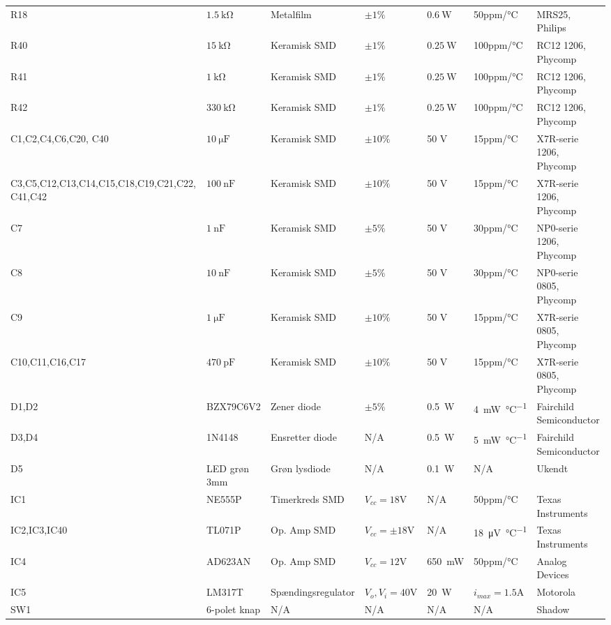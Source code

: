 \begin{table}[h!]
\begin{threeparttable}
\begin{tabular}{ l l l l l l l }
R18 & $\SI{1.5}{\kilo\ohm}$		& Metalfilm	& $\pm 1\%$ 		 & $\SI{0.6}{\watt}$	  & 50ppm/\si{\celsius}  & MRS25, Philips \\
R40 & $\SI{15}{\kilo\ohm}$ 	& Keramisk SMD 	& $\pm 1\%$			& $\SI{0.25}{\watt}$ 	& 100ppm/\si{\celsius}	& RC12 1206, Phycomp \\
R41 & $\SI{1}{\kilo\ohm}$ 	& Keramisk SMD 	& $\pm 1\%$			& $\SI{0.25}{\watt}$ 	& 100ppm/\si{\celsius}	& RC12 1206, Phycomp \\
R42 & $\SI{330}{\kilo\ohm}$ 	& Keramisk SMD 	& $\pm 1\%$			& $\SI{0.25}{\watt}$ 	& 100ppm/\si{\celsius}	& RC12 1206, Phycomp \\
C1,C2,C4,C6,C20, C40 & $\SI{10}{\micro\farad}$ & Keramisk SMD & $\pm 10\%$ & 50 \si{\volt}  & 15ppm/\si{\celsius} & X7R-serie 1206, Phycomp \\
C3,C5,C12,C13,C14,C15,C18,C19,C21,C22, C41,C42 & $\SI{100}{\nano\farad}$ & Keramisk SMD & $\pm 10\%$ & 50 \si{\volt} & 15ppm/\si{\celsius} & X7R-serie 1206, Phycomp \\
C7 & $\SI{1}{\nano\farad}$ & Keramisk SMD & $\pm 5\%$ & 50 \si{\volt} & 30ppm/\si{\celsius} & NP0-serie 1206, Phycomp \\
C8 & $\SI{10}{\nano\farad}$ & Keramisk SMD & $\pm 5\%$ & 50 \si{\volt} & 30ppm/\si{\celsius} & NP0-serie 0805, Phycomp \\
C9 & $\SI{1}{\micro\farad}$ & Keramisk SMD & $\pm 10\%$ & 50 \si{\volt} & 15ppm/\si{\celsius} & X7R-serie 0805, Phycomp \\
C10,C11,C16,C17 & $\SI{470}{\pico\farad}$ & Keramisk SMD & $\pm 10\%$ & 50 \si{\volt} & 15ppm/\si{\celsius} & X7R-serie 0805, Phycomp \\
D1,D2 & BZX79C6V2 & Zener diode & $\pm 5 \%$ & \SI{0.5}{\watt} & \SI{4}{\milli\watt\per\celsius} & Fairchild Semiconductor \\
D3,D4 & 1N4148 & Ensretter diode & N/A & \SI{0.5}{\watt} & \SI{5}{\milli\watt\per\celsius} & Fairchild Semiconductor \\
D5 & LED grøn 3mm & Grøn lysdiode & N/A & \SI{0.1}{\watt} & N/A & Ukendt \\
IC1 & NE555P & Timerkreds SMD & $V_{cc}= 18 \si{\volt}$ & N/A & 50ppm/\si{\celsius} & Texas Instruments \\
IC2,IC3,IC40 & TL071P & Op. Amp SMD & $V_{cc}=\pm 18 \si{\volt}$ & N/A & \SI{18}{\micro\volt\per\celsius} & Texas Instruments \\
IC4 & AD623AN & Op. Amp SMD & $V_{cc} = 12 \si{\volt}$ & \SI{650}{\milli\watt} & 50ppm/\si{\celsius} & Analog Devices \\
IC5 & LM317T & Spændingsregulator & $V_{o} , V_{i} = 40 \si{\volt}$ & \SI{20}{\watt} & $i_{max} = 1.5 \si{\ampere}$ & Motorola \\
SW1 & 6-polet knap & N/A & N/A & N/A & N/A & Shadow \\


\end{tabular}
\end{threeparttable}
\end{table}
